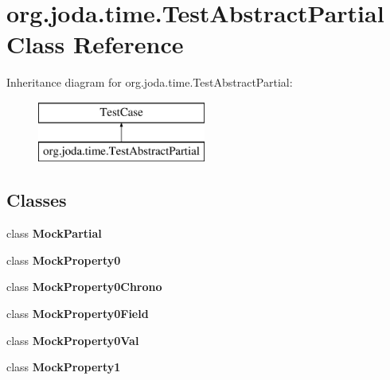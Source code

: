 \hypertarget{classorg_1_1joda_1_1time_1_1_test_abstract_partial}{\section{org.\-joda.\-time.\-Test\-Abstract\-Partial Class Reference}
\label{classorg_1_1joda_1_1time_1_1_test_abstract_partial}
}
Inheritance diagram for org.\-joda.\-time.\-Test\-Abstract\-Partial\-:\begin{figure}[H]
\begin{center}
\leavevmode
\includegraphics[height=2.000000cm]{classorg_1_1joda_1_1time_1_1_test_abstract_partial}
\end{center}
\end{figure}
\subsection*{Classes}
\begin{DoxyCompactItemize}
\item 
class {\bfseries Mock\-Partial}
\item 
class {\bfseries Mock\-Property0}
\item 
class {\bfseries Mock\-Property0\-Chrono}
\item 
class {\bfseries Mock\-Property0\-Field}
\item 
class {\bfseries Mock\-Property0\-Val}
\item 
class {\bfseries Mock\-Property1}
\end{DoxyCompactItemize}
